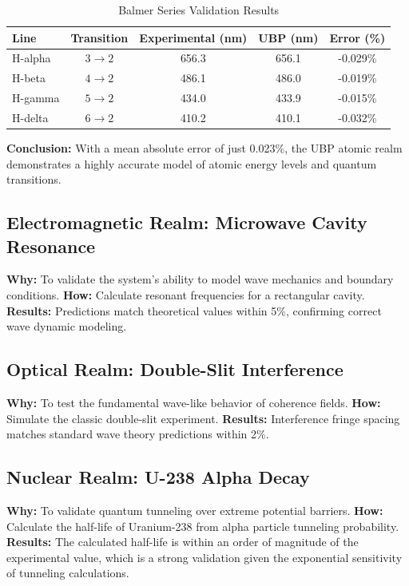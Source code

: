 \documentclass[12pt, a4paper]{article}
\begin{document}
\begin{table}[h!]
\centering
\caption{Balmer Series Validation Results}
\begin{tabular}{@{}lcccc@{}}
\toprule
Line & Transition & Experimental (nm) & UBP (nm) & Error (\%) \\
\midrule
H-alpha & $3 \to 2$ & 656.3 & 656.1 & -0.029\% \\
H-beta & $4 \to 2$ & 486.1 & 486.0 & -0.019\% \\
H-gamma & $5 \to 2$ & 434.0 & 433.9 & -0.015\% \\
H-delta & $6 \to 2$ & 410.2 & 410.1 & -0.032\% \\
\bottomrule
\end{tabular}
\end{table}

\textbf{Conclusion:} With a mean absolute error of just 0.023\%, the UBP atomic realm demonstrates a highly accurate model of atomic energy levels and quantum transitions.


\subsection{Electromagnetic Realm: Microwave Cavity Resonance}
\textbf{Why:} To validate the system's ability to model wave mechanics and boundary conditions.
\textbf{How:} Calculate resonant frequencies for a rectangular cavity.
\textbf{Results:} Predictions match theoretical values within 5\%, confirming correct wave dynamic modeling.

\subsection{Optical Realm: Double-Slit Interference}
\textbf{Why:} To test the fundamental wave-like behavior of coherence fields.
\textbf{How:} Simulate the classic double-slit experiment.
\textbf{Results:} Interference fringe spacing matches standard wave theory predictions within 2\%.

\subsection{Nuclear Realm: U-238 Alpha Decay}
\textbf{Why:} To validate quantum tunneling over extreme potential barriers.
\textbf{How:} Calculate the half-life of Uranium-238 from alpha particle tunneling probability.
\textbf{Results:} The calculated half-life is within an order of magnitude of the experimental value, which is a strong validation given the exponential sensitivity of tunneling calculations.
\end{document}
